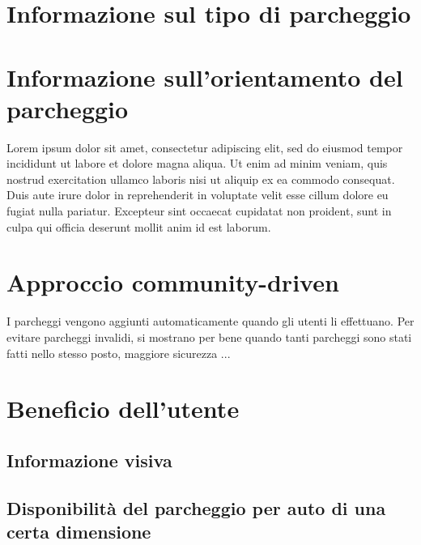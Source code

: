 \section{Informazione sul tipo di parcheggio} 


\section{Informazione sull'orientamento del parcheggio} Lorem ipsum dolor sit amet, consectetur adipiscing elit, sed do eiusmod tempor incididunt ut labore et dolore magna aliqua. Ut enim ad minim veniam, quis nostrud exercitation ullamco laboris nisi ut aliquip ex ea commodo consequat. Duis aute irure dolor in reprehenderit in voluptate velit esse cillum dolore eu fugiat nulla pariatur. Excepteur sint occaecat cupidatat non proident, sunt in culpa qui officia deserunt mollit anim id est laborum.

\section{Approccio community-driven}

I parcheggi vengono aggiunti automaticamente quando gli utenti li effettuano. 
Per evitare parcheggi invalidi, si mostrano per bene quando tanti parcheggi sono stati
fatti nello stesso posto, maggiore sicurezza ...

\section{Beneficio dell'utente} 

\subsection{Informazione visiva}

\subsection{Disponibilità del parcheggio per auto di una certa dimensione}
